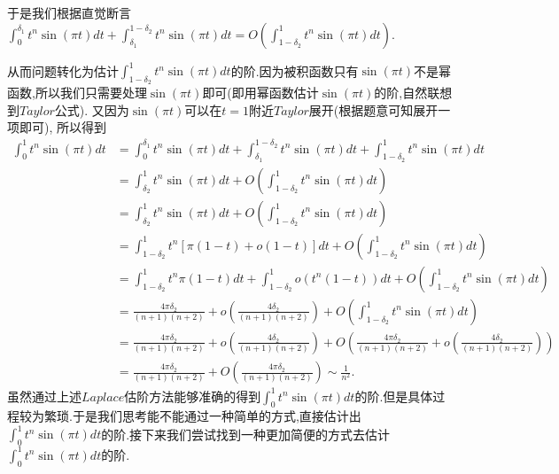 \documentclass[lang=cn,newtx,10pt,scheme=chinese]{elegantbook}
\begin{document}
\begin{note}
于是我们根据直觉断言$\int_0^{\delta _1}{t^n\sin \left( \pi t \right) dt}+\int_{\delta _1}^{1-\delta _2}{t^n\sin \left( \pi t \right) dt}=O\left( \int_{1-\delta _2}^1{t^n\sin \left( \pi t \right) dt} \right)$.

从而问题转化为估计$\int_{1-\delta _2}^1{t^n\sin \left( \pi t \right) dt}$的阶.因为被积函数只有$\sin(\pi t)$不是幂函数,所以我们只需要处理$\sin(\pi t)$即可(即用幂函数估计$\sin(\pi t)$的阶,自然联想到$Taylor$公式).
又因为$\sin(\pi t)$可以在$t=1$附近$Taylor$展开(根据题意可知展开一项即可),
所以得到
\begin{align*}
  \int_0^1{t^n\sin \left( \pi t \right) dt}&=\int_0^{\delta _1}{t^n\sin \left( \pi t \right) dt}+\int_{\delta _1}^{1-\delta _2}{t^n\sin \left( \pi t \right) dt}+\int_{1-\delta _2}^1{t^n\sin \left( \pi t \right) dt}
\\
&=\int_{\delta _2}^1{t^n\sin \left( \pi t \right) dt}+O\left( \int_{1-\delta _2}^1{t^n\sin \left( \pi t \right) dt} \right) 
\\
&=\int_{\delta _2}^1{t^n\sin \left( \pi t \right) dt}+O\left( \int_{1-\delta _2}^1{t^n\sin \left( \pi t \right) dt} \right) 
\\
&=\int_{1-\delta _2}^1{t^n\left[ \pi \left( 1-t \right) +o\left( 1-t \right) \right] dt}+O\left( \int_{1-\delta _2}^1{t^n\sin \left( \pi t \right) dt} \right) 
\\
&=\int_{1-\delta _2}^1{t^n\pi \left( 1-t \right) dt}+\int_{1-\delta _2}^1{o\left( t^n\left( 1-t \right) \right) dt}+O\left( \int_{1-\delta _2}^1{t^n\sin \left( \pi t \right) dt} \right) 
\\
&=\frac{4\pi \delta _2}{\left( n+1 \right) \left( n+2 \right)}+o\left( \frac{4\delta _2}{\left( n+1 \right) \left( n+2 \right)} \right) +O\left( \int_{1-\delta _2}^1{t^n\sin \left( \pi t \right) dt} \right) 
\\
&=\frac{4\pi \delta _2}{\left( n+1 \right) \left( n+2 \right)}+o\left( \frac{4\delta _2}{\left( n+1 \right) \left( n+2 \right)} \right) +O\left( \frac{4\pi \delta _2}{\left( n+1 \right) \left( n+2 \right)}+o\left( \frac{4\delta _2}{\left( n+1 \right) \left( n+2 \right)} \right) \right) 
\\
&=\frac{4\pi \delta _2}{\left( n+1 \right) \left( n+2 \right)}+O\left( \frac{4\pi \delta _2}{\left( n+1 \right) \left( n+2 \right)} \right) \sim \frac{1}{n^2}.
\end{align*}
虽然通过上述$Laplace$估阶方法能够准确的得到$\int_0^1{t^n\sin \left( \pi t \right) dt}$的阶.但是具体过程较为繁琐.于是我们思考能不能通过一种简单的方式,直接估计出$\int_0^1{t^n\sin \left( \pi t \right) dt}$的阶.接下来我们尝试找到一种更加简便的方式去估计$\int_0^1{t^n\sin \left( \pi t \right) dt}$的阶.


\end{note}
\end{document}
